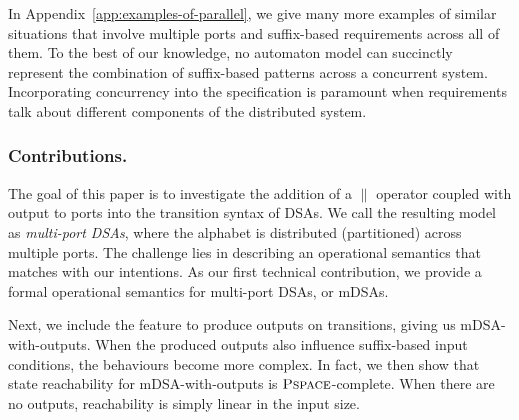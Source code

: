   In Appendix~\ref{app:examples-of-parallel}, we give many more examples of similar situations that involve multiple ports and suffix-based requirements across all of them. To the best of our knowledge, no automaton model can succinctly represent the combination of suffix-based patterns across a concurrent system. Incorporating concurrency into the specification is paramount when requirements talk about different components of the distributed system. 
  
  \subsubsection*{Contributions.} The goal of this paper is to investigate the
  addition of a $\parallel$ operator coupled with output to ports into the
  transition syntax of DSAs. We call the resulting model as \emph{multi-port
  DSAs}, where the alphabet is distributed (partitioned) across multiple ports.
  The challenge lies in describing an operational semantics that matches with
  our intentions. As our first technical contribution, we provide a formal
  operational semantics for multi-port DSAs, or mDSAs.
  
  Next, we include the feature to produce outputs on transitions, giving us mDSA-with-outputs. When the produced outputs also influence suffix-based input conditions, the behaviours become more complex. In fact, we then show that state reachability for mDSA-with-outputs is $\operatorname{\textsc{Pspace}}$-complete. When there are no outputs, reachability is simply linear in the input size. %

